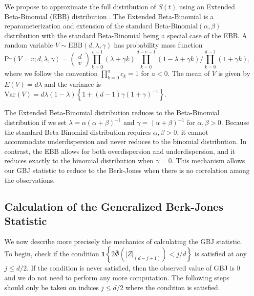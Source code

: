 \documentclass[12pt]{article}
\begin{document}
We propose to approximate the full distribution of $S(t)$ using an Extended Beta-Binomial 
(EBB) distribution \citep{EBB}. 
The Extended Beta-Binomial is a reparameterization and extension of the standard 
Beta-Binomial$(\alpha,\beta)$ distribution with the standard Beta-Binomial being a special 
case of the EBB. 
A random variable $V\sim\text{EBB}\left(d,\lambda,\gamma\right)$ has probability mass function
\begin{equation}
\text{Pr}\left(V=v;d,\lambda,\gamma\right)=\left(\begin{array}{c}
d\\
v
\end{array}\right) \prod_{k=0}^{v-1}(\lambda+\gamma k)\prod_{k=0}^{d-v-1}(1-\lambda+\gamma k) \bigg/ \prod_{k=0}^{d-1}(1+\gamma k),
\label{p2_eq:EBB_PMF}
\end{equation}
where we follow the convention $\prod_{k=0}^{a}c_{k}=1$ for $a<0$.
The mean of $V$ is given by $E(V)=d\lambda$ and the variance is 
$\text{Var}(V)=d\lambda(1-\lambda)\left\{1+(d-1)\gamma(1+\gamma)^{-1}\right\}$.


The Extended Beta-Binomial distribution reduces to the Beta-Binomial distribution if we set
$\lambda=\alpha(\alpha+\beta)^{-1}$ and 
$\gamma=(\alpha+\beta)^{-1}$ for $\alpha,\beta>0$.
Because the standard Beta-Binomial distribution requires $\alpha,\beta>0$, it cannot 
accommodate underdispersion and never reduces to the binomial distribution. 
In contrast, the EBB allows for both overdispersion and underdispersion, and it reduces 
exactly to the binomial distribution when $\gamma=0$. 
This mechanism allows our GBJ statistic to reduce to the Berk-Jones when there is no 
correlation among the observations.

\subsection{Calculation of the Generalized Berk-Jones Statistic}
\label{p2_ss:calculate_GBJ}

We now describe more precisely the mechanics of calculating the GBJ
statistic. To begin, check if the condition 
$\mathbf{1}\left\{2\bar{\Phi}\left(|Z|_{(d-j+1)}\right) < j/d \right\}$ is satisfied at 
any $j \leq d/2$.
If the condition is never satisfied, then the observed value of GBJ is 0
and we do not need to perform any more computation. 
The following steps should only be taken on indices $j \leq d/2 $ where the 
condition is satisfied.
\end{document}
